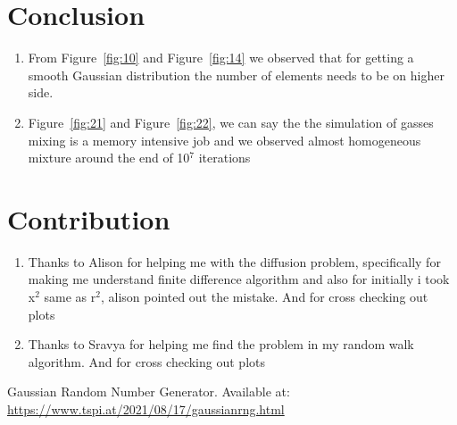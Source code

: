 \documentclass[11pt]{article}
\begin{document}
\section{Conclusion}
\begin{enumerate}
    \item From Figure~\ref{fig:10} and Figure~\ref{fig:14} we observed that for getting a smooth Gaussian distribution the number of elements needs to be on higher side.
    \item Figure~\ref{fig:21} and Figure~\ref{fig:22}, we can say the the simulation of gasses mixing is a memory intensive job and we observed almost homogeneous mixture around the end of 10$^7$ iterations
\end{enumerate}

\section*{Contribution}
\begin{enumerate}
    \item Thanks to Alison for helping me with the diffusion problem, specifically for making me understand finite difference algorithm and also for initially i took x$^2$ same as r$^2$, alison pointed out the mistake. And for cross checking out plots
    \item Thanks to Sravya for helping me find the problem in my random walk algorithm. And for cross checking out plots
\end{enumerate}

\begin{thebibliography}{}
 Gaussian Random Number Generator. Available at: \url{https://www.tspi.at/2021/08/17/gaussianrng.html}
\end{thebibliography}
\end{document}
